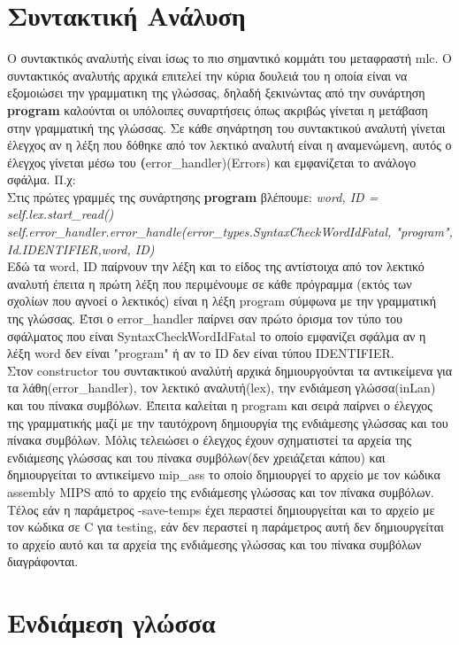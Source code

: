 \documentclass[12pt,a4paper,a4paper]{report}
\begin{document}
\chapter{Συντακτική Ανάλυση}
Ο συντακτικός αναλυτής είναι ίσως το πιο σημαντικό κομμάτι του μεταφραστή mlc. Ο συντακτικός αναλυτής αρχικά επιτελεί την κύρια δουλειά του η οποία είναι να εξομοιώσει την γραμματικη της γλώσσας, δηλαδή ξεκινώντας από την συνάρτηση \textbf{program} καλούνται οι υπόλοιπες συναρτήσεις όπως ακριβώς γίνεται η μετάβαση στην γραμματική της γλώσσας. Σε κάθε σηνάρτηση του συντακτικού αναλυτή γίνεται έλεγχος αν η λέξη που δόθηκε από τον λεκτικό αναλυτή είναι η αναμενώμενη, αυτός ο έλεγχος γίνεται μέσω του \textbf(error\_handler)(Εrrors) και εμφανίζεται το ανάλογο σφάλμα. Π.χ:\\
Στις πρώτες γραμμές της συνάρτησης \textbf{program} βλέπουμε:
\emph{word, ID = self.lex.start\_read()} \\
\emph{self.error\_handler.error\_handle(error\_types.SyntaxCheckWordIdFatal, "program", Id.IDENTIFIER,word, ID) }\\
Eδώ τα word, ID παίρνουν την λέξη και το είδος της αντίστοιχα από τον λεκτικό αναλυτή έπειτα η πρώτη λέξη που περιμένουμε σε κάθε πρόγραμμα (εκτός των σχολίων που αγνοεί ο λεκτικός) είναι η λέξη program σύμφωνα με την γραμματική της γλώσσας. Έτσι ο error\_handler παίρνει σαν πρώτο όρισμα τον τύπο του σφάλματος που είναι SyntaxCheckWordIdFatal  το οποίο εμφανίζει σφάλμα αν η λέξη word δεν είναι "program" ή αν το ΙD δεν είναι τύπου IDENTIFIER.\\
Στον constructor του συντακτικού αναλύτή αρχικά δημιουργούνται τα αντικείμενα για τα λάθη(error\_handler), τον λεκτικό αναλυτή(lex), την ενδιάμεση γλώσσα(inLan) και του πίνακα συμβόλων. Έπειτα καλείται η program και σειρά παίρνει ο έλεγχος της γραμματικής μαζί με την ταυτόχρονη δημιουργία της ενδιάμεσης γλώσσας και του πίνακα συμβόλων. Μόλις τελειώσει ο έλεγχος έχουν σχηματιστεί τα αρχεία της ενδιάμεσης γλώσσας και του πίνακα συμβόλων(δεν χρειάζεται κάπου) και δημιουργείται  το αντικείμενο mip\_ass το οποίο δημιουργεί το αρχείο με τον κώδικα assembly MIPS από το αρχείο της ενδιάμεσης γλώσσας και τον πίνακα συμβόλων. Τέλος εάν η παράμετρος -save-temps έχει περαστεί δημιουργείται και το αρχείο με τον κώδικα σε C για testing, εάν δεν περαστεί η παράμετρος αυτή δεν δημιουργείται το αρχείο αυτό και τα αρχεία της ενδιάμεσης γλώσσας και του πίνακα συμβόλων διαγράφονται.\\

\chapter{Ενδιάμεση γλώσσα}
\end{document}
